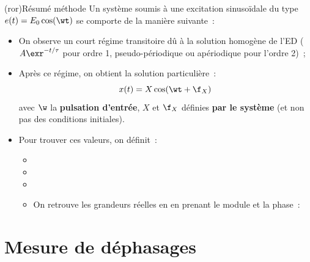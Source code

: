 \documentclass[../../main/main.tex]{subfiles}
\begin{document}
\begin{tcb}(ror){Résumé méthode}
	Un système soumis à une excitation sinusoïdale du type $e(t) = E_0\cos(\wt)$
	se comporte de la manière suivante~:
	\begin{itemize}
		\item On observe un court régime transitoire dû à la solution homogène de
		      l'ED ($A\exr^{-t/\tau}$ pour ordre 1, pseudo-périodique ou apériodique
		      pour l'ordre 2)~;
		\item Après ce régime, on obtient la solution particulière~:
		      \[
			      x(t) = X\cos(\wt+\f_X)
		      \]
		      avec $\w$ la \textbf{pulsation d'entrée}, $X$ et $\f_X$  définies
		      \textbf{par le système} (et non pas des conditions initiales).
		\item Pour trouver ces valeurs, on définit~:
		      \begin{itemize}
			      \item {}
			            {}
			            \vspace{-10pt}
			      \item {}
			            {}
			            \vspace{-10pt}
			      \item {}
			            {}
			            \vspace{-5pt}
			      \item On retrouve les grandeurs réelles en en prenant le module et
			            la phase~:
			            \psw{%
				            \[
					            \boxed{X = \abs{\Xu}}
					            \qet
					            \boxed{\f_X = \arg*{\Xu}}
				            \]
			            }%
			            \vspace{-15pt}
		      \end{itemize}
	\end{itemize}
\end{tcb}

\section{Mesure de déphasages}
\end{document}
